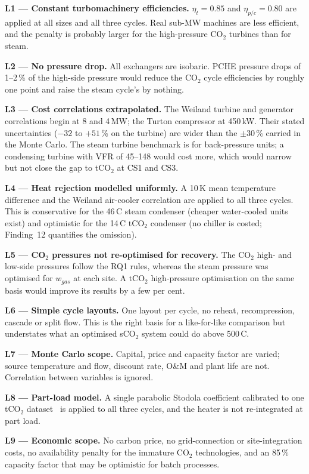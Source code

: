 \begin{limitbox}
\textbf{L1 --- Constant turbomachinery efficiencies.} $\eta_t = 0.85$ and
$\eta_{p/c} = 0.80$ are applied at all sizes and all three cycles. Real
sub-MW machines are less efficient, and the penalty is probably larger for
the high-pressure CO$_2$ turbines than for steam.

\textbf{L2 --- No pressure drop.} All exchangers are isobaric. PCHE pressure
drops of 1--2\,\% of the high-side pressure would reduce the CO$_2$ cycle
efficiencies by roughly one point and raise the steam cycle's by nothing.

\textbf{L3 --- Cost correlations extrapolated.} The Weiland turbine and
generator correlations begin at 8 and 4\,MW; the Turton compressor at
450\,kW. Their stated uncertainties ($-32$ to $+51$\,\% on the turbine) are
wider than the $\pm30$\,\% carried in the Monte Carlo. The steam turbine
benchmark is for back-pressure units; a condensing turbine with VFR of
45--148 would cost more, which would narrow but not close the gap to tCO$_2$
at CS1 and CS3.

\textbf{L4 --- Heat rejection modelled uniformly.} A 10\,K mean temperature
difference and the Weiland air-cooler correlation are applied to all three
cycles. This is conservative for the 46\,\textdegree C steam condenser
(cheaper water-cooled units exist) and optimistic for the 14\,\textdegree C
tCO$_2$ condenser (no chiller is costed; Finding~12 quantifies the omission).

\textbf{L5 --- CO$_2$ pressures not re-optimised for recovery.} The CO$_2$
high- and low-side pressures follow the RQ1 rules, whereas the steam
pressure was optimised for $w_{gas}$ at each site. A tCO$_2$ high-pressure
optimisation on the same basis would improve its results by a few per cent.

\textbf{L6 --- Simple cycle layouts.} One layout per cycle, no reheat,
recompression, cascade or split flow. This is the right basis for a
like-for-like comparison but understates what an optimised sCO$_2$ system
could do above 500\,\textdegree C.

\textbf{L7 --- Monte Carlo scope.} Capital, price and capacity factor are
varied; source temperature and flow, discount rate, O\&M and plant life are
not. Correlation between variables is ignored.

\textbf{L8 --- Part-load model.} A single parabolic Stodola coefficient
calibrated to one tCO$_2$ dataset~\cite{Yang2024} is applied to all three
cycles, and the heater is not re-integrated at part load.

\textbf{L9 --- Economic scope.} No carbon price, no grid-connection or
site-integration costs, no availability penalty for the immature CO$_2$
technologies, and an 85\,\% capacity factor that may be optimistic for
batch processes.
\end{limitbox}

